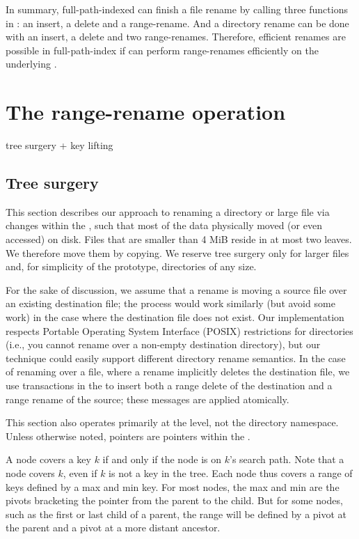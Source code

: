 In summary, full-path-indexed \betrfs can finish a file rename by calling three
functions in \fti: an insert, a delete and a range-rename.
And a directory rename can be done with an insert, a delete and two
range-renames.
Therefore, efficient renames are possible in full-path-index \betrfs if
\fti can perform range-renames efficiently on the underlying \bets.

\section{The \bet range-rename operation}

tree surgery + key lifting

\subsection{Tree surgery}

This section describes our approach to renaming a directory or large file via
changes within the \bet, such that most of the data physically moved (or even
accessed) on disk.
Files that are smaller than 4 MiB reside in at most two leaves.
We therefore move them by copying.
We reserve tree surgery only for larger files and, for simplicity of the
prototype, directories of any size.

For the sake of discussion, we assume that a rename is moving a source file over
an existing destination file;
the process would work similarly (but avoid some work) in the case where the
destination file does not exist.
Our implementation respects Portable Operating System Interface (POSIX)
restrictions for directories
(i.e., you cannot rename over a non-empty destination directory),
but our technique could easily support different directory rename semantics.
In the case of renaming over a file, where a rename implicitly deletes the
destination file, we use transactions in the \bet to insert both a range delete
of the destination and a range rename of the source;
these messages are applied atomically.

This section also operates primarily at the \bet level, not the directory
namespace.  Unless otherwise noted, pointers are pointers within the \bet.

A \bet node covers a key $k$ if and only if the node is on $k$'s search
path. Note that a node covers $k$, even if $k$ is not a key in the
tree.  Each \bet node thus covers a range of keys defined by a max
and min key.  For most nodes, the max and min are the
pivots bracketing the pointer from the parent to the child.  But for
some nodes, such as the first or last child of a parent, the range
will be defined by a pivot at the parent and a pivot at a more distant ancestor.

